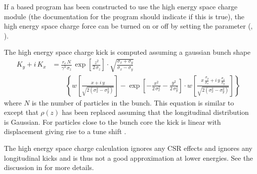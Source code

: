 If a \bmad based program has been constructed to use the high energy space charge module (the
documentation for the program should indicate if this is true), the high energy space charge force
can be turned on or off by setting the  parameter
(, ). 

The high energy space charge kick is computed assuming a gaussian bunch shape 
\begin{align}
  K_y + i \, K_x &=
  \frac{r_e \, N}{\gamma^3 \, \sigma_z} \, \exp \left[ \frac{z^2}{2 \, \sigma_z} \right] \cdot
  \sqrt{\frac{\sigma_x + \sigma_y}{\sigma_x - \sigma_y}} \label{fsp1r2} \\
  & \qquad \left\{ w \left[ \frac{x + i \, y}{\sqrt{2 (\sigma_x^2 - \sigma_y^2)}} \right] -
  \exp \left[ -\frac{x^2}{2 \, \sigma_x^2} - \frac{y^2}{2 \, \sigma_y^2} \right] \cdot
  w \left[ \frac{x \, \frac{\sigma_y}{\sigma_x} + i \, y \, \frac{\sigma_x}{\sigma_y}}
  {\sqrt{2 (\sigma_x^2 - \sigma_y^2)}} \right] \right\}
  \nonumber 
\end{align}
where $N$ is the number of particles in the bunch. This equation is similar to  except
that $\rho(z)$ has been replaced assuming that the longitudinal distribution is Gaussian. For
particles close to the bunch core the kick is linear with displacement giving rise to a tune shift
\cite{b:decking}.

The high energy space charge calculation ignores any CSR effects and ignores any longitudinal kicks
and is thus not a good approximation at lower energies. See the discussion in \cite{b:csr} for more
details.







